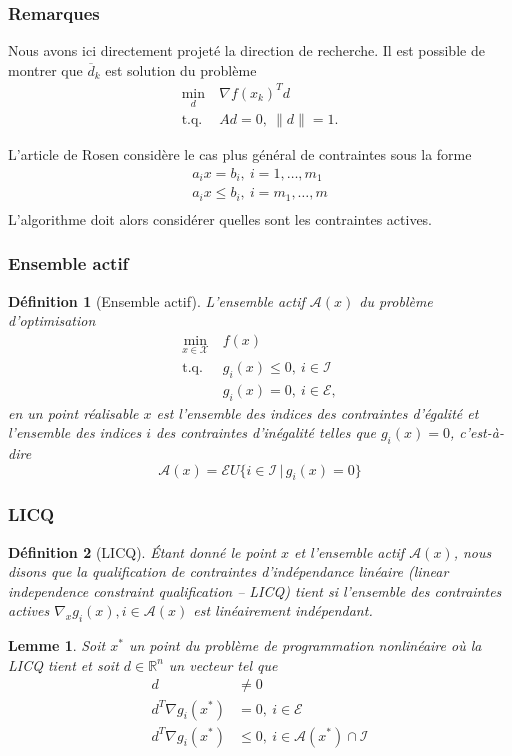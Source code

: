 \documentclass[usepdftitle=false]{beamer}
\newtheorem{defn}{Définition}
\newtheorem{lem}{Lemme}
\def\cA{\mathcal{A}}
\def\cE{\mathcal{E}}
\def\cI{\mathcal{I}}
\def\cX{\mathcal{X}}
\def\RR{\mathbb{R}}
\begin{document}
\begin{frame}
	\frametitle{Remarques}
	
	Nous avons ici directement projeté la direction de recherche. Il est possible de montrer que $\overline{d}_k$ est solution du problème
	\begin{align*}
	\min_{d} \ & \nabla f(x_k)^Td \\
	\mbox{t.q. } & Ad = 0,\ \|d\| = 1.
	\end{align*}
	
	\mbox{}
	
	L'article de Rosen considère le cas plus général de contraintes sous la forme
	\begin{align*}
	a_i x = b_i,\ i = 1,\ldots,m_1 \\
	a_i x \leq b_i,\ i = m_1,\ldots,m \\
	\end{align*}
	L'algorithme doit alors considérer quelles sont les contraintes actives.
	
\end{frame}

\begin{frame}
\frametitle{Ensemble actif}

\begin{defn}[Ensemble actif]
L'ensemble actif $\cA(x)$ du problème d'optimisation
\begin{align*}
\min_{x \in \cX} \ & f(x) \\
\mbox{t.q. } & g_i(x) \leq 0,\ i \in \cI \\
& g_i(x) = 0,\ i \in \cE,
\end{align*}
en un point réalisable $x$ est l'ensemble des indices des contraintes d'égalité et l'ensemble des indices $i$ des contraintes d'inégalité telles que $g_i(x) = 0$, c'est-à-dire
$$
\cA(x) = \cE U \{ i \in \cI \,|\, g_i(x) = 0 \}
$$
\end{defn}

\end{frame}

\begin{frame}
\frametitle{LICQ}

\begin{defn}[LICQ]
Étant donné le point $x$ et l'ensemble actif $\cA(x)$, nous disons que la qualification de contraintes d'indépendance linéaire (linear
independence constraint qualification -- LICQ) tient si l'ensemble des contraintes actives $\nabla_x g_i(x), i \in \cA(x)$ est linéairement indépendant.
\end{defn}

\begin{lem}
	Soit $x^*$ un point du problème de programmation nonlinéaire où la LICQ tient et soit $d \in \RR^n$ un vecteur tel que
	\begin{align*}
	d & \ne 0 \\
	d^T \nabla g_i(x^*) &= 0,\ i \in \cE \\
	d^T \nabla g_i(x^*) &\leq 0,\ i \in \cA(x^*) \cap \cI
	\end{align*}
\end{lem}

\end{frame}
\end{document}
